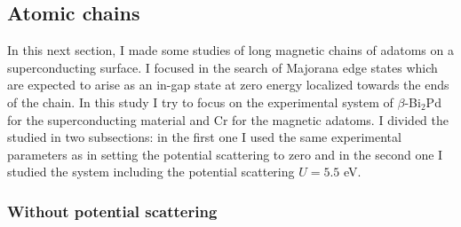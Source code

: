 \documentclass[letterpaper,12pt]{article}
\begin{document}
 
\subsection{Atomic chains}
In this next section, I made some studies of long magnetic chains of adatoms on a superconducting surface. I focused in the search of Majorana edge states which are expected to arise as an in-gap state at zero energy localized towards the ends of the chain. In this study I try to focus on the experimental system of $\beta$-Bi$_2$Pd for the superconducting material and Cr for the magnetic adatoms. I divided the studied in two subsections: in the first one I used the same experimental parameters as in \cite{DJ} setting the potential scattering to zero and in the second one I studied the system including the potential scattering $U = 5.5$ eV.

\subsubsection{Without potential scattering}
\end{document}
